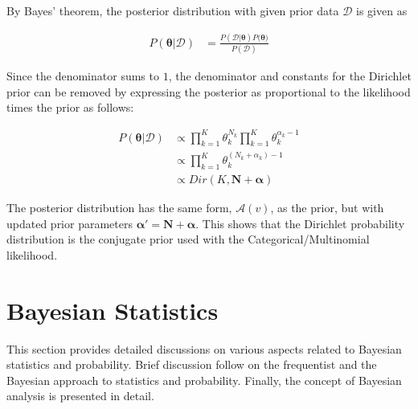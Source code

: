 By Bayes' theorem, the posterior distribution with given prior data $\boldsymbol{\mathcal{D}}$ is given as

\begin{equation}
	\label{eq:probability:conjugate_priors:mult_likelihood:posterior}
	\begin{split}
		P(\boldsymbol{\theta} \vert \boldsymbol{\mathcal{D}}) &= \frac{P(\boldsymbol{\mathcal{D}} \vert \boldsymbol{\theta}) P(\boldsymbol{\theta)}}{P(\boldsymbol{\mathcal{D}})}
	\end{split}
\end{equation}

Since the denominator sums to $1$, the denominator and constants for the Dirichlet prior can be removed by expressing the posterior as proportional to the likelihood times the prior as follows:

\begin{equation}
	\label{eq:probability:conjugate_priors:mult_likelihood:posterior_propto}
	\begin{split}
		P(\boldsymbol{\theta} \vert \boldsymbol{\mathcal{D}}) &\propto \prod_{k=1}^{K} \theta_{k}^{N_{k}} \prod_{k=1}^{K} \theta_{k}^{\alpha_{k} - 1}\\
		&\propto \prod_{k=1}^{K} \theta_{k}^{(N_{k} + \alpha_{k}) - 1} \\
		&\propto Dir(K, \boldsymbol{N} + \boldsymbol{\alpha})
	\end{split}
\end{equation}

The posterior distribution has the same form, $\mathcal{A}(v)$, as the prior, but with updated prior parameters $\boldsymbol{\alpha'} = \boldsymbol{N} + \boldsymbol{\alpha}$. This shows that the Dirichlet probability distribution is the conjugate prior used with the Categorical/Multinomial likelihood.

\section{Bayesian Statistics}
\label{sec:probability:bayesian_statistics}

This section provides detailed discussions on various aspects related to Bayesian statistics and probability. Brief discussion follow on the frequentist and the Bayesian approach to statistics and probability. Finally, the concept of Bayesian analysis is presented in detail.

